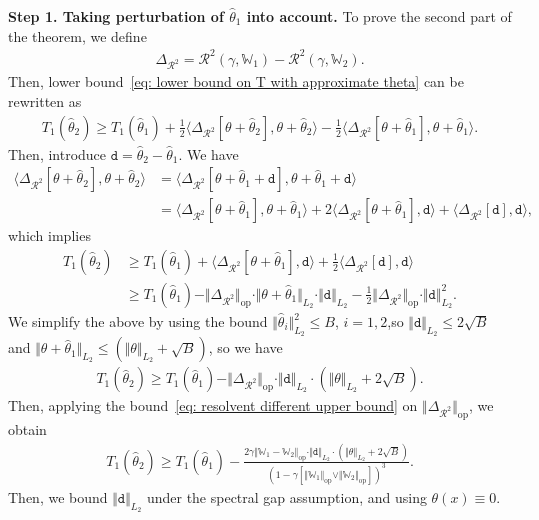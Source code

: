 \documentclass[11pt]{article}
\newcommand{\op}{\mathrm{op}}
\newcommand{\bbW}{\mathbb{W}}
\newcommand{\cR}{\mathcal{R}}
\newcommand{\<}{\langle}
\renewcommand{\>}{\rangle}
\newcommand{\ttd}{\mathtt{d}}
\theoremstyle{plain}
\theoremstyle{definition}
\theoremstyle{remark}
\begin{document}
{\noindent \textbf{Step 1. Taking perturbation of $\hat{\theta}_1$ into account.} To prove the second part of the theorem, we define
\begin{align*}
    \Delta_{\cR^2} = \cR^2(\gamma, \bbW_1) - \cR^2(\gamma, \bbW_2).
\end{align*}
Then, lower bound~\eqref{eq: lower bound on T with approximate theta} can be rewritten as
\begin{align*}
    T_1(\hat{\theta}_2) \ge T_1(\hat{\theta}_1) + \frac{1}{2} \langle \Delta_{\cR^2} [\theta + \hat{\theta}_2], \theta + \hat{\theta}_2 \rangle - \frac{1}{2} \langle \Delta_{\cR^2} [\theta + \hat{\theta}_1], \theta + \hat{\theta}_1 \rangle.
\end{align*}
Then, introduce $\ttd = \hat{\theta}_2 - \hat{\theta}_1$. We have
\begin{align*}
    \langle \Delta_{\cR^2} [\theta + \hat{\theta}_2], \theta + \hat{\theta}_2 \rangle & = \langle \Delta_{\cR^2} [\theta + \hat{\theta}_1 + \ttd], \theta + \hat{\theta}_1 + \ttd \rangle \\
    & = \langle \Delta_{\cR^2} [\theta + \hat{\theta}_1], \theta + \hat{\theta}_1 \rangle + 2 \langle \Delta_{\cR^2} [\theta + \hat{\theta}_1], \ttd \rangle + \langle \Delta_{\cR^2} [\ttd], \ttd \rangle,
\end{align*}
which implies
\begin{align*}
    T_1(\hat{\theta}_2) & \ge T_1(\hat{\theta}_1) + \langle \Delta_{\cR^2} [\theta + \hat{\theta}_1], \ttd \rangle + \frac{1}{2} \langle \Delta_{\cR^2} [\ttd], \ttd \rangle \\
    & \ge T_1(\hat{\theta}_1) - \Vert \Delta_{\cR^2} \Vert_{\op} \cdot \Vert \theta + \hat{\theta}_1 \Vert_{L_2} \cdot \Vert \ttd \Vert_{L_2} - \frac{1}{2} \Vert \Delta_{\cR^2} \Vert_{\op} \cdot \Vert \ttd \Vert_{L_2}^2.
\end{align*}
We simplify the above by using the bound $\Vert \hat{\theta}_i \Vert_{L_2}^2 \le B$, $i = 1, 2$,so $\Vert \ttd \Vert_{L_2} \le 2\sqrt{B}$ and $\Vert \theta + \hat{\theta}_1 \Vert_{L_2} \le (\Vert \theta \Vert_{L_2} + \sqrt{B})$, so we have
\begin{align*}
    T_1(\hat{\theta}_2) \ge T_1(\hat{\theta}_1) -  \Vert \Delta_{\cR^2} \Vert_{\op} \cdot \Vert \ttd \Vert_{L_2} \cdot (\Vert \theta \Vert_{L_2} + 2 \sqrt{B}).
\end{align*}
Then, applying the bound~\eqref{eq: resolvent different upper bound} on $\Vert \Delta_{\cR^2} \Vert_{\op}$, we obtain
\begin{align}
\label{eq: perturbation bound with theta difference}
    T_1(\hat{\theta}_2) \ge T_1(\hat{\theta}_1) - \frac{2 \gamma \Vert \bbW_1 - \bbW_2 \Vert_{\op} \cdot \Vert \ttd \Vert_{L_2} \cdot (\Vert \theta \Vert_{L_2} + 2 \sqrt{B})}{(1 - \gamma [\Vert \bbW_1 \Vert_{\op} \vee \Vert \bbW_2 \Vert_{\op}])^3}.
\end{align}
Then, we bound $\Vert \ttd \Vert_{L_2}$ under the spectral gap assumption, and using $\theta(x) \equiv 0$.

}
\end{document}
